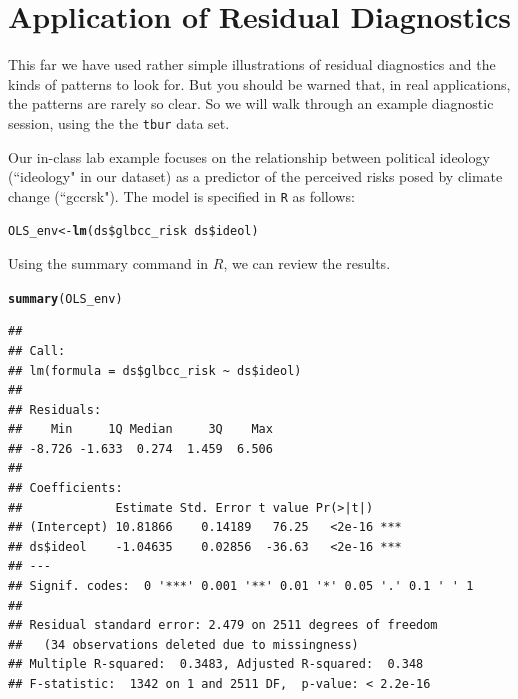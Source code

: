 \documentclass[11pt,openany]{book}\usepackage[]{graphicx}\usepackage[]{color}
\makeatletter
\newcommand{\hlopt}[1]{\textcolor[rgb]{0,0,0}{#1}}%
\newcommand{\hlstd}[1]{\textcolor[rgb]{0.345,0.345,0.345}{#1}}%
\newcommand{\hlkwb}[1]{\textcolor[rgb]{0.69,0.353,0.396}{#1}}%
\newcommand{\hlkwd}[1]{\textcolor[rgb]{0.737,0.353,0.396}{\textbf{#1}}}%
\newenvironment{kframe}{%
 \def\at@end@of@kframe{}%
 \ifinner\ifhmode%
  \def\at@end@of@kframe{\end{minipage}}%
  \begin{minipage}{\columnwidth}%
 \fi\fi%
 \def\FrameCommand##1{\hskip\@totalleftmargin \hskip-\fboxsep
 \colorbox{shadecolor}{##1}\hskip-\fboxsep
     \hskip-\linewidth \hskip-\@totalleftmargin \hskip\columnwidth}%
 \MakeFramed {\advance\hsize-\width
   \@totalleftmargin\z@ \linewidth\hsize
   \@setminipage}}%
 {\par\unskip\endMakeFramed%
 \at@end@of@kframe}
\newenvironment{knitrout}{}{} %
\renewenvironment{knitrout}{\begin{singlespace}}{\end{singlespace}}
\makeatother
\begin{document}
\section{Application of Residual Diagnostics}

This far we have used rather simple illustrations of residual diagnostics and the kinds of patterns to look for. But you should be warned that, in real applications, the patterns are rarely so clear. So we will walk through an example diagnostic session, using the the \texttt{tbur} data set.

Our in-class lab example focuses on the relationship between political ideology (``ideology" in our dataset) as a predictor of the perceived risks posed by climate change (``gccrsk"). The model is specified in \texttt{R} as follows:

\begin{knitrout}
\color{fgcolor}\begin{kframe}
\begin{alltt}
\hlstd{OLS_env} \hlkwb{<-} \hlkwd{lm}\hlstd{(ds}\hlopt{\$}\hlstd{glbcc_risk} \hlopt{~} \hlstd{ds}\hlopt{\$}\hlstd{ideol)}
\end{alltt}
\end{kframe}
\end{knitrout}

\noindent Using the summary command in $R$, we can review the results.
\begin{knitrout}
\color{fgcolor}\begin{kframe}
\begin{alltt}
\hlkwd{summary}\hlstd{(OLS_env)}
\end{alltt}
\begin{verbatim}
## 
## Call:
## lm(formula = ds$glbcc_risk ~ ds$ideol)
## 
## Residuals:
##    Min     1Q Median     3Q    Max 
## -8.726 -1.633  0.274  1.459  6.506 
## 
## Coefficients:
##             Estimate Std. Error t value Pr(>|t|)    
## (Intercept) 10.81866    0.14189   76.25   <2e-16 ***
## ds$ideol    -1.04635    0.02856  -36.63   <2e-16 ***
## ---
## Signif. codes:  0 '***' 0.001 '**' 0.01 '*' 0.05 '.' 0.1 ' ' 1
## 
## Residual standard error: 2.479 on 2511 degrees of freedom
##   (34 observations deleted due to missingness)
## Multiple R-squared:  0.3483,	Adjusted R-squared:  0.348 
## F-statistic:  1342 on 1 and 2511 DF,  p-value: < 2.2e-16
\end{verbatim}
\end{kframe}
\end{knitrout}
\end{document}
